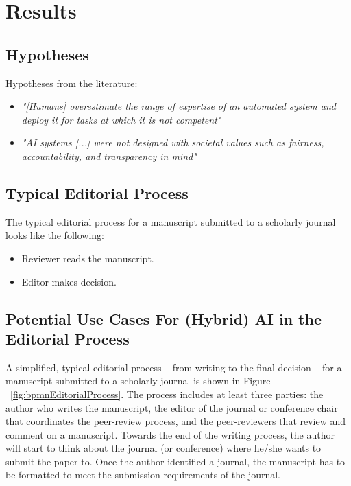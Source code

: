 \section{Results}
\label{sec:results}

\subsection{Hypotheses}

Hypotheses from the literature:

\begin{itemize}
    \item \textit{"[Humans] overestimate the range of expertise of an automated system and deploy it for tasks at which it is not competent"} \citep[p. 19]{akataResearchAgendaHybrid2020}
    \item \textit{"AI systems [...] were not designed with societal values such as fairness, accountability, and transparency in mind"} \citep[p. 19]{akataResearchAgendaHybrid2020}
\end{itemize}



\subsection{Typical Editorial Process}

The typical editorial process for a manuscript submitted to a scholarly journal looks like the following:

\begin{itemize}
    \item Reviewer reads the manuscript.
    \item Editor makes decision.
\end{itemize}


\subsection{Potential Use Cases For (Hybrid) AI in the Editorial Process}

A simplified, typical editorial process -- from writing to the final decision -- for a manuscript submitted to a scholarly journal is shown in
Figure ~\ref{fig:bpmnEditorialProcess}. The process includes at least three parties: the author who writes the manuscript, the editor of the
journal or conference chair that coordinates the peer-review process, and the peer-reviewers that review and comment on a manuscript. Towards
the end of the writing process, the author will start to think about the journal (or conference) where he/she wants to submit the paper to.
Once the author identified a journal, the manuscript has to be formatted to meet the submission requirements of the journal. 

